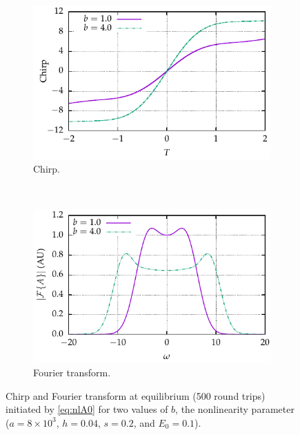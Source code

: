 \documentclass[9pt,twocolumn,twoside]{osajnl}
\begin{document}
\begin{figure}[tbp]
	\centering
	\begin{subfigure}{\columnwidth}
		\centering
		\includegraphics{Figures/Chirp}
		\caption{Chirp.}
		\label{fig:chirp}
	\end{subfigure} \\
	\vspace{3mm}
	\begin{subfigure}{\columnwidth}
		\centering
		\includegraphics{Figures/FT}
		\caption{Fourier transform.}
		\label{fig:ft}
	\end{subfigure}
	\caption{Chirp and Fourier transform at equilibrium (500 round trips) initiated by \eqref{eq:nlA0} for two values of $b$, the nonlinearity parameter ($a = 8 \times 10^3$, $h = 0.04$, $s = 0.2$, and $E_0 = 0.1$).}
	\label{fig:chirpft}
\end{figure}
\end{document}
